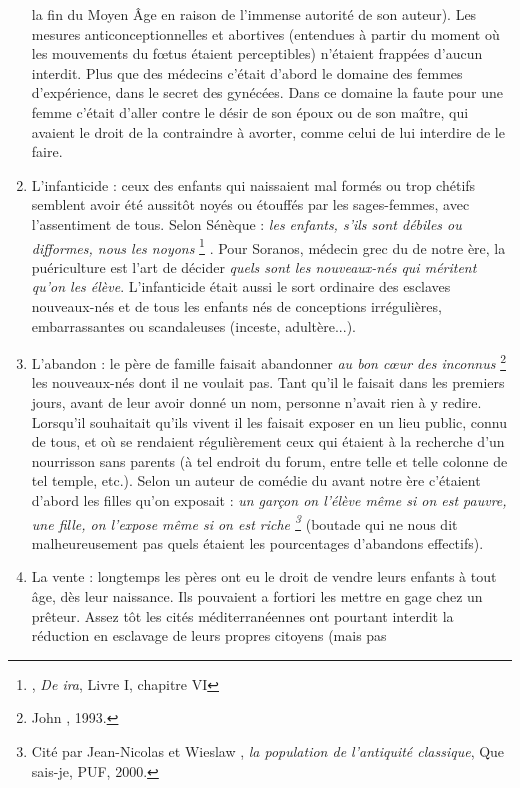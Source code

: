\begin{enumerate}
la fin du Moyen Âge en raison de l'immense autorité de son auteur).
Les mesures anticonceptionnelles et abortives (entendues à partir du
moment où les mouvements du fœtus étaient perceptibles) n'étaient
frappées d'aucun interdit. Plus que des médecins c'était d'abord le domaine
des femmes d'expérience, dans le secret des gynécées. Dans ce
domaine la faute pour une femme c'était d'aller contre le désir de son
époux ou de son maître, qui avaient le droit de la contraindre à avorter,
comme celui de lui interdire de le faire.
\item L'infanticide : ceux des enfants qui naissaient mal formés ou
trop chétifs semblent avoir été aussitôt noyés ou étouffés par les sages-femmes,
avec l'assentiment de tous. Selon Sénèque : {\emph{les enfants, s'ils sont
débiles ou difformes, nous les noyons}%
\footnote{, \emph{De ira}, Livre I, chapitre VI}%
}.
Pour \hbox{Soranos}, médecin grec du
 de notre ère, la puériculture est l'art de décider {\emph{quels sont les
nouveaux-nés qui méritent qu'on les élève}}. L'infanticide était aussi le sort ordinaire
des esclaves nouveaux-nés et de tous les enfants nés de conceptions
irrégulières, embarrassantes ou scandaleuses (inceste, adultère...).
\item L'abandon : le père de famille faisait abandonner {\emph{au bon cœur
des inconnus}%
\footnote{John , 1993.}%
} les nouveaux-nés dont il ne voulait pas. Tant qu'il le faisait
dans les premiers jours, avant de leur avoir donné un nom, personne
n'avait rien à y redire. Lorsqu'il souhaitait qu'ils vivent il les faisait exposer
en un lieu public, connu de tous, et où se rendaient régulièrement
ceux qui étaient à la recherche d'un nourrisson sans parents (à tel endroit
du forum, entre telle et telle colonne de tel temple, etc.). Selon un auteur
de comédie du  avant notre ère c'étaient d'abord les filles
qu'on exposait : {\emph{un garçon on l'élève même si on est pauvre, une fille, on l'expose
même si on est riche%
\footnote{Cité par Jean-Nicolas  et Wieslaw , \emph{la population de l'antiquité classique}, Que sais-je, PUF, 2000.}%
}} (boutade qui ne nous dit malheureusement pas
quels étaient les pourcentages d'abandons effectifs).
\item La vente : longtemps les pères ont eu le droit de vendre leurs
enfants à tout âge, dès leur naissance. Ils pouvaient a fortiori les mettre
en gage chez un prêteur. Assez tôt les cités méditerranéennes ont pourtant
interdit la réduction en esclavage de leurs propres citoyens (mais pas

\end{enumerate}
